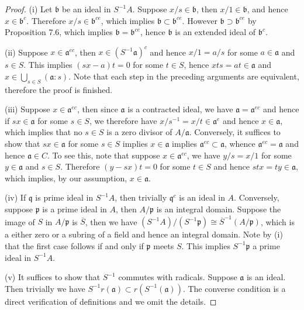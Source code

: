 \begin{proof}
(i) Let $\mathfrak{b}$ be an ideal in $S^{-1}A$. Suppose $x/s\in\mathfrak{b}$, then $x/1\in\mathfrak{b}$, and hence $x\in\mathfrak{b}^c$. Therefore $x/s\in\mathfrak{b}^{ce}$, which implies $\mathfrak{b}\subset\mathfrak{b}^{ce}$. However $\mathfrak{b}\supset\mathfrak{b}^{ce}$ by Proposition 7.6, which implies $\mathfrak{b}=\mathfrak{b}^{ce}$, hence $\mathfrak{b}$ is an extended ideal of $\mathfrak{b}^{c}$.\par
(ii) Suppose $x\in\mathfrak{a}^{ec}$, then $x\in(S^{-1}\mathfrak{a})^c$ and hence $x/1=a/s$ for some $a\in\mathfrak{a}$ and $s\in S$. This implies $(sx-a)t=0$ for some $t\in S$, hence $xts=at\in\mathfrak{a}$ and $x\in\bigcup_{s\in S}(\mathfrak{a}:s)$. Note that each step in the preceding arguments are equivalent, therefore the proof is finished.\par
(iii) Suppose $x\in\mathfrak{a}^{ec}$, then since $\mathfrak{a}$ is a contracted ideal, we have $\mathfrak{a}=\mathfrak{a}^{ec}$ and hence if $sx\in\mathfrak{a}$ for some $s\in S$, we therefore have $x/s^{-1}=x/t\in\mathfrak{a}^e$ and hence $x\in\mathfrak{a}$, which implies that no $s\in S$ is a zero divisor of $A/\mathfrak{a}$. Conversely, it suffices to show that $sx\in\mathfrak{a}$ for some $s\in S$ implies $x\in\mathfrak{a}$ implies $\mathfrak{a}^{ec}\subset\mathfrak{a}$, whence $\mathfrak{a}^{ec}=\mathfrak{a}$ and hence $\mathfrak{a}\in C$. To see this, note that suppose $x\in\mathfrak{a}^{ec}$, we have $y/s=x/1$ for some $y\in\mathfrak{a}$ and $s\in S$. Therefore $(y-sx)t=0$ for some $t\in S$ and hence $stx=ty\in\mathfrak{a}$, which implies, by our assumption, $x\in\mathfrak{a}$.\par
(iv) If $\mathfrak{q}$ is prime ideal in $S^{-1}A$, then trivially $\mathfrak{q}^c$ is an ideal in $A$. Conversely, suppose $\mathfrak{p}$ is a prime ideal in $A$, then $A/\mathfrak{p}$ is an integral domain. Suppose the image of $S$ in $A/\mathfrak{p}$ is $\overline{S}$, then we have $(S^{-1}A)/(S^{-1}\mathfrak{p})\cong\overline{S}^{-1}(A/\mathfrak{p})$, which is a either zero or a subring of a field and hence an integral domain. Note by (i) that the first case follows if and only if $\mathfrak{p}$ meets $S$. This implies $S^{-1}\mathfrak{p}$ a prime ideal in $S^{-1}A$.\par
(v) It suffices to show that $S^{-1}$ commutes with radicals. Suppose $\mathfrak{a}$ is an ideal. Then trivially we have $S^{-1}r(\mathfrak{a})\subset r(S^{-1}(\mathfrak{a}))$. The converse condition is a direct verification of definitions and we omit the details.
\end{proof}
